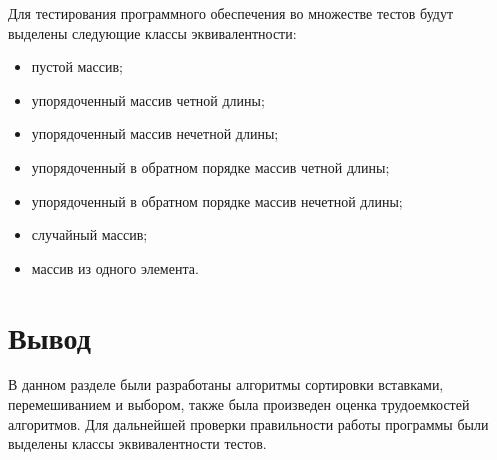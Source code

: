 Для тестирования программного обеспечения во множестве тестов будут выделены
следующие классы эквивалентности:
\begin{itemize}[left=\parindent]
    \item пустой массив; 
    \item упорядоченный массив четной длины;
    \item упорядоченный массив нечетной длины;
    \item упорядоченный в обратном порядке массив четной длины;
    \item упорядоченный в обратном порядке массив нечетной длины;
    \item случайный массив;
    \item массив из одного элемента.
\end{itemize}

\section{Вывод}

В данном разделе были разработаны алгоритмы сортировки вставками,
перемешиванием и выбором, также была произведен оценка трудоемкостей
алгоритмов. Для дальнейшей проверки правильности работы программы были выделены
классы эквивалентности тестов.
